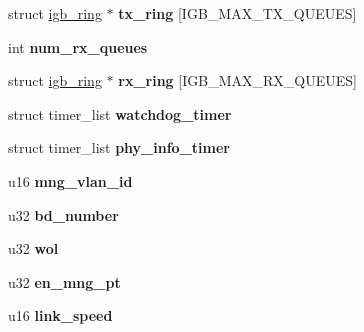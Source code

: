 \begin{DoxyCompactItemize}
\item 
\hypertarget{structigb__adapter_a051a3fc00a4bb8a963f6b541d16a87a9}{
struct \hyperlink{structigb__ring}{igb\_\-ring} $\ast$ {\bfseries tx\_\-ring} \mbox{[}IGB\_\-MAX\_\-TX\_\-QUEUES\mbox{]}}
\label{structigb__adapter_a051a3fc00a4bb8a963f6b541d16a87a9}

\item 
\hypertarget{structigb__adapter_a5e24c3796b38363eac294d144ed9500a}{
int {\bfseries num\_\-rx\_\-queues}}
\label{structigb__adapter_a5e24c3796b38363eac294d144ed9500a}

\item 
\hypertarget{structigb__adapter_a128da55d62041e4ab9db839d59360902}{
struct \hyperlink{structigb__ring}{igb\_\-ring} $\ast$ {\bfseries rx\_\-ring} \mbox{[}IGB\_\-MAX\_\-RX\_\-QUEUES\mbox{]}}
\label{structigb__adapter_a128da55d62041e4ab9db839d59360902}

\item 
\hypertarget{structigb__adapter_a6e315ef41d5d52d8b3ced7471615a91d}{
struct timer\_\-list {\bfseries watchdog\_\-timer}}
\label{structigb__adapter_a6e315ef41d5d52d8b3ced7471615a91d}

\item 
\hypertarget{structigb__adapter_a41680cf6ff5f8203f6b3bd98b2561791}{
struct timer\_\-list {\bfseries phy\_\-info\_\-timer}}
\label{structigb__adapter_a41680cf6ff5f8203f6b3bd98b2561791}

\item 
\hypertarget{structigb__adapter_abe77c53b8c0f58cb74f49a18a0335b02}{
u16 {\bfseries mng\_\-vlan\_\-id}}
\label{structigb__adapter_abe77c53b8c0f58cb74f49a18a0335b02}

\item 
\hypertarget{structigb__adapter_a9d7a39b09956542a4c9848a49dc40787}{
u32 {\bfseries bd\_\-number}}
\label{structigb__adapter_a9d7a39b09956542a4c9848a49dc40787}

\item 
\hypertarget{structigb__adapter_a2f35dfe1b1001c6f79be79d4738010e9}{
u32 {\bfseries wol}}
\label{structigb__adapter_a2f35dfe1b1001c6f79be79d4738010e9}

\item 
\hypertarget{structigb__adapter_aff7573014c651f09810a61d0b1db48d7}{
u32 {\bfseries en\_\-mng\_\-pt}}
\label{structigb__adapter_aff7573014c651f09810a61d0b1db48d7}

\item 
\hypertarget{structigb__adapter_a4f37d7873ec93335b6496fab1d8811c3}{
u16 {\bfseries link\_\-speed}}
\label{structigb__adapter_a4f37d7873ec93335b6496fab1d8811c3}


\end{DoxyCompactItemize}
